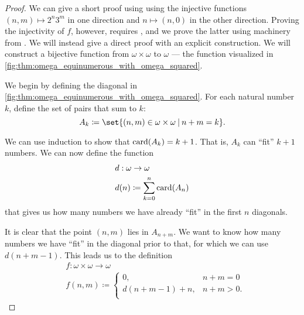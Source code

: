 \begin{proof}
  We can give a short proof using  using the injective functions \( (n, m) \mapsto 2^n 3^m \) in one direction and \( n \mapsto (n, 0) \) in the other direction. Proving the injectivity of \( f \), however, requires , and we prove the latter using machinery from . We will instead give a direct proof with an explicit construction. We will construct a bijective function from \( \omega \times \omega \) to \( \omega \) --- the function visualized in \cref{fig:thm:omega_equinumerous_with_omega_squared}.

  We begin by defining the diagonal in \cref{fig:thm:omega_equinumerous_with_omega_squared}. For each natural number \( k \), define the set of pairs that sum to \( k \):
  \begin{equation*}
    A_k \coloneqq \set{ (n, m) \in \omega \times \omega \given n + m = k }.
  \end{equation*}

  We can use induction to show that \( \operatorname{card}(A_k) = k + 1 \). That is, \( A_k \) can \enquote{fit} \( k + 1 \) numbers. We can now define the function
  \begin{equation*}
    \begin{aligned}
      &d: \omega \to \omega \\
      &d(n) \coloneqq \sum_{k=0}^n \operatorname{card}(A_n)
    \end{aligned}
  \end{equation*}
  that gives us how many numbers we have already \enquote{fit} in the first \( n \) diagonals.

  It is clear that the point \( (n, m) \) lies in \( A_{n + m} \). We want to know how many numbers we have \enquote{fit} in the diagonal prior to that, for which we can use \( d(n + m - 1) \). This leads us to the definition
  \begin{equation*}
    \begin{aligned}
      &f: \omega \times \omega \to \omega \\
      &f(n, m) \coloneqq \begin{cases}
        0,                &n + m = 0 \\
        d(n + m - 1) + n, &n + m > 0. \\
      \end{cases}
    \end{aligned}
  \end{equation*}


\end{proof}
